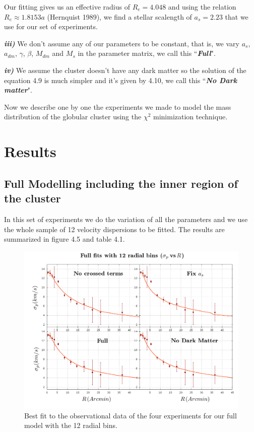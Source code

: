 Our fitting gives us an effective radius of $R_{e}=4.048$ and using the relation $R_{e}\approx1.8153a$ (Hernquist 1989), we find a stellar scalength of $a_{s}=2.23$ that we use for our set of experiments.

\textbf{\textit{iii)}} We don't assume any of our parameters to be constant, that is, we vary $a_{s}$, $a_{dm}$, $\gamma$, $\beta$, $M_{dm}$ and $M_{s}$ in the parameter matrix, we call this ``\textbf{\textit{Full}}". 

\textbf{\textit{iv)}} We assume the cluster doesn't have any dark matter so the solution of the equation 4.9 is much simpler and it's given by 4.10, we call this ``\textbf{\textit{No Dark matter}}".

Now we describe one by one the experiments we made to model the mass distribution of the globular cluster using the $\chi^{2}$ minimization technique.


\section{Results}

\subsection{Full Modelling including the inner region of the cluster}

In this set of experiments we do the variation of all the parameters and we use the whole sample of 12 velocity dispersions to be fitted. The results are summarized in figure 4.5 and table 4.1.

\begin{figure}[H]
\centering
\includegraphics[width=15cm]{images/all_params_refinado_12.png}
\caption[Best fit of the full model for 12 radial bins]{Best fit to the observational data of the four experiments for our full model with the 12 radial bins.}
\end{figure}

